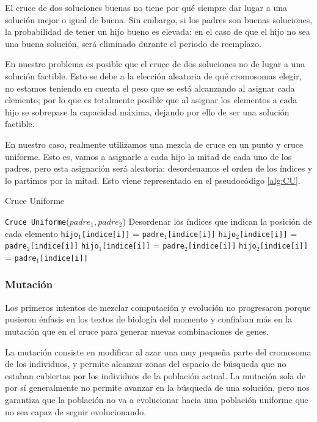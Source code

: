 El cruce de dos soluciones buenas no tiene por qué siempre dar lugar a una solución mejor o igual de buena. 
Sin embargo, si los padres son buenas soluciones, la probabilidad de tener un hijo bueno es elevada; en el caso de que el hijo no sea una buena solución, será eliminado durante el periodo de reemplazo. 

En nuestro problema es posible que el cruce de dos soluciones no de lugar a una solución factible. 
Esto se debe a la elección aleatoria de qué cromosomas elegir, no estamos teniendo en cuenta el peso que se está alcanzando al asignar cada elemento; por lo que es totalmente posible que  al asignar los elementos a cada hijo se sobrepase la capacidad máxima, dejando por ello de ser una solución factible. 


En nuestro caso, realmente utilizamos una mezcla de cruce en un punto y cruce uniforme. 
Esto es, vamos a asignarle a cada hijo la mitad de cada uno de los padres, pero esta asignación será aleatoria: desordenamos el orden de los índices y lo partimos por la mitad. 
Esto viene representado en el pseudocódigo \ref{alg:CU}.

\begin{algorithm}[h]
\caption{Cruce Uniforme}\label{alg:CU}
\begin{algorithmic}[1]
\Procedure \texttt{Cruce Uniforme}($padre_1, padre_2$)
\State Desordenar los índices que indican la posición de cada elemento
		\State \texttt{hijo$_1$[indice[i]]} = \texttt{padre$_1$[indice[i]]}
		\State \texttt{hijo$_2$[indice[i]]} = \texttt{padre$_2$[indice[i]]}
	\Else
		\State \texttt{hijo$_1$[indice[i]]} = \texttt{padre$_2$[indice[i]]}
		\State \texttt{hijo$_2$[indice[i]]} = \texttt{padre$_1$[indice[i]]}
	\EndIf
\EndFor
\EndProcedure
\end{algorithmic}
\end{algorithm}

\subsubsection{Mutación}

Los primeros intentos de mezclar computación y evolución no progresaron porque pusieron énfasis en los textos de biología del momento y confiaban más en la mutación que en el cruce para generar nuevas combinaciones de genes. 

La mutación consiste en modificar al azar una muy pequeña parte del cromosoma de los individuos, y permite alcanzar zonas del espacio de búsqueda que no estaban cubiertas por los individuos de la población actual. 
La mutación sola de por sí generalmente no permite avanzar en la búsqueda de una solución, pero nos garantiza que la población no va a evolucionar hacia una población uniforme que no sea capaz de seguir evolucionando. 

